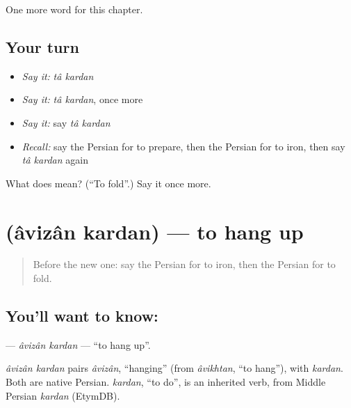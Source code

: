 \begin{grammarlens}[title={What you've built}]
One more word for this chapter.
\end{grammarlens}

\subsection*{Your turn}
\begin{itemize}
\raggedright
  \item \emph{Say it:} \emph{tâ kardan}
  \item \emph{Say it:} \emph{tâ kardan}, once more
  \item \emph{Say it:} say \emph{tâ kardan}
  \item \emph{Recall:} say the Persian for to prepare, then the Persian for to iron, then say \emph{tâ kardan} again
\end{itemize}

\begin{tcolorbox}[breakable,colback=teal!4,colframe=teal!35!black,title={Before you move on}]
What does   mean? (\textquotedblleft{}To fold\textquotedblright{}.) Say it once more.
\end{tcolorbox}
\section[\texorpdfstring{\fa{آویزان} \fa{کردن} (âvizân kardan)}{آویزان کردن (âvizân kardan)}]{  (âvizân kardan) — to hang up}

\label{lesson:FA-C254-avizan-kardan}



\begin{quote}
Before the new one: say the Persian for to iron, then the Persian for to fold.
\end{quote}

\subsection*{You'll want to know:  }
\textbf{ } — \emph{âvizân kardan} — \textquotedblleft{}to hang up\textquotedblright{}.

\begin{cousinweb}
\emph{âvizân kardan} pairs \emph{âvizân}, \textquotedblleft{}hanging\textquotedblright{} (from \emph{âvikhtan}, \textquotedblleft{}to hang\textquotedblright{}), with \emph{kardan}. Both are native Persian. \emph{kardan}, \textquotedblleft{}to do\textquotedblright{}, is an inherited verb, from Middle Persian \emph{kardan} (EtymDB).
\end{cousinweb}

